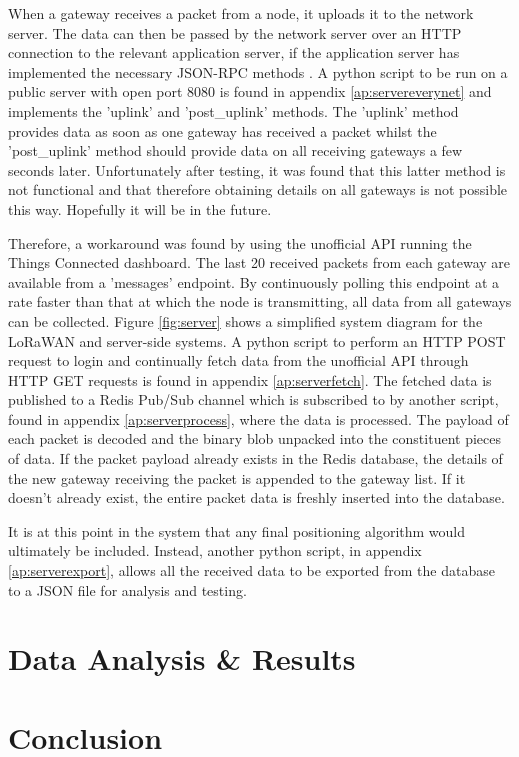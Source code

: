 \documentclass[a4paper]{report}
\begin{document}
    When a gateway receives a packet from a node, it uploads it to the network server. The data can then be passed by the network server over an HTTP connection to the relevant application server, if the application server has implemented the necessary JSON-RPC methods \cite{EverynetAPI}. A python script to be run on a public server with open port 8080 is found in appendix \ref{ap:servereverynet} and implements the 'uplink' and 'post\_uplink' methods. The 'uplink' method provides data as soon as one gateway has received a packet whilst the 'post\_uplink' method should provide data on all receiving gateways a few seconds later. Unfortunately after testing, it was found that this latter method is not functional and that therefore obtaining details on all gateways is not possible this way. Hopefully it will be in the future.

    Therefore, a workaround was found by using the unofficial API running the Things Connected dashboard. The last 20 received packets from each gateway are available from a 'messages' endpoint. By continuously polling this endpoint at a rate faster than that at which the node is transmitting, all data from all gateways can be collected. Figure \ref{fig:server} shows a simplified system diagram for the LoRaWAN and server-side systems. A python script to perform an HTTP POST request to login and continually fetch data from the unofficial API through HTTP GET requests is found in appendix \ref{ap:serverfetch}. The fetched data is published to a Redis Pub/Sub channel which is subscribed to by another script, found in appendix \ref{ap:serverprocess}, where the data is processed. The payload of each packet is decoded and the binary blob unpacked into the constituent pieces of data. If the packet payload already exists in the Redis database, the details of the new gateway receiving the packet is appended to the gateway list. If it doesn't already exist, the entire packet data is freshly inserted into the database.

    It is at this point in the system that any final positioning algorithm would ultimately be included. Instead, another python script, in appendix \ref{ap:serverexport}, allows all the received data to be exported from the database to a JSON file for analysis and testing.

\chapter{Data Analysis \& Results}

\chapter{Conclusion}
\end{document}
